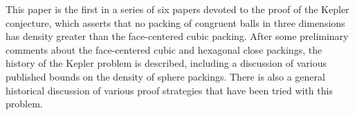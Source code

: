 This paper is the first in a series of six papers devoted to the
proof of the Kepler conjecture, which asserts that no packing of
congruent balls in three dimensions has density greater than the
face-centered cubic packing.   After some preliminary comments about
the face-centered cubic and hexagonal close packings, the history of
the Kepler problem is described, including a discussion of various
published bounds on the density of sphere packings.  There is also a
general historical discussion of various proof strategies that have
been tried with this problem.
